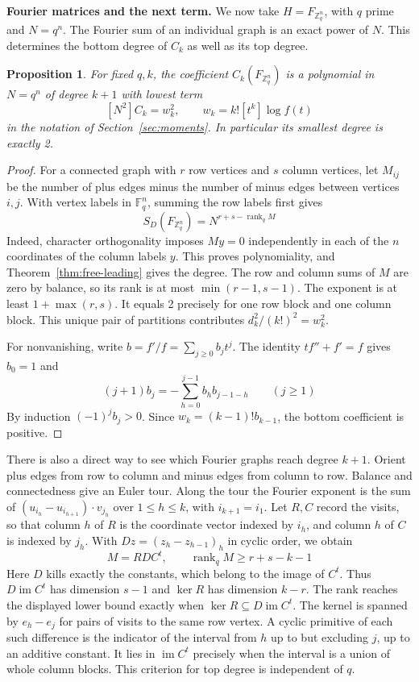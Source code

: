 \documentclass[11pt,a4paper]{article}
\newtheorem{prop}[thm]{Proposition}
\theoremstyle{remark}
\begin{document}
\medskip
\noindent\textbf{Fourier matrices and the next term.}
We now take $H=F_{\mathbb Z_q^n}$, with $q$ prime and $N=q^n$.
The Fourier sum of an individual graph is an exact power of $N$.
This determines the bottom degree of $C_k$ as well as its top degree.

\begin{samepage}
\begin{prop}\label{prop:free-fourier}
For fixed $q,k$, the coefficient $C_k(F_{\mathbb Z_q^n})$ is a polynomial in
$N=q^n$ of degree $k+1$ with lowest term
\[
 [N^2]C_k=w_k^2,\qquad w_k=k![t^k]\log f(t)
\]
in the notation of Section~\ref{sec:moments}. In particular its smallest
degree is exactly 2.
\end{prop}
\end{samepage}
\begin{proof}
For a connected graph with $r$ row vertices and $s$ column vertices, let
$M_{ij}$ be the number of plus edges minus the number of minus edges
between vertices $i,j$. With vertex labels in $\mathbb F_q^n$, summing
the row labels first gives
\[
 S_D(F_{\mathbb Z_q^n})=N^{r+s-\operatorname{rank}_q M}
\]
Indeed, character orthogonality imposes $M y=0$ independently in each
of the $n$ coordinates of the column labels $y$. This proves
polynomiality, and Theorem~\ref{thm:free-leading} gives the degree.
The row and column sums of $M$ are zero by balance, so its rank is at
most $\min(r-1,s-1)$. The exponent is at least $1+\max(r,s)$.
It equals 2 precisely for one row block and one column block.
This unique pair of partitions contributes $d_k^2/(k!)^2=w_k^2$.

For nonvanishing, write $b=f'/f=\sum_{j\geq0}b_jt^j$. The identity
$tf''+f'=f$ gives $b_0=1$ and
\[
 (j+1)b_j=-\sum_{h=0}^{j-1}b_h b_{j-1-h}\qquad(j\geq1)
\]
By induction $(-1)^j b_j>0$. Since $w_k=(k-1)!b_{k-1}$, the bottom
coefficient is positive.
\end{proof}

There is also a direct way to see which Fourier graphs reach degree
$k+1$. Orient plus edges from row to column and minus edges from column
to row. Balance and connectedness give an Euler tour. Along the tour the
Fourier exponent is the sum of $(u_{i_h}-u_{i_{h+1}})\cdot v_{j_h}$
over $1\leq h\leq k$, with $i_{k+1}=i_1$. Let $R,C$ record the visits, so that
column $h$ of $R$ is the coordinate vector indexed by $i_h$, and column
$h$ of $C$ is indexed by $j_h$. With $D z=(z_h-z_{h-1})_h$ in cyclic
order, we obtain
\[
 M=RDC^t,\qquad \operatorname{rank}_q M\geq r+s-k-1
\]
Here $D$ kills exactly the constants, which belong to the image of $C^t$.
Thus $D\operatorname{im} C^t$ has dimension $s-1$ and $\ker R$ has
dimension $k-r$. The rank reaches the displayed lower bound exactly when
$\ker R\subseteq D\operatorname{im} C^t$. The kernel is spanned by
$e_h-e_j$ for pairs of visits to the same row vertex. A cyclic primitive
of each such difference is the indicator of the interval from $h$ up to
but excluding $j$, up to an additive constant. It lies in
$\operatorname{im} C^t$ precisely when the interval is a union of whole
column blocks. This criterion for top degree is independent of $q$.
\end{document}
